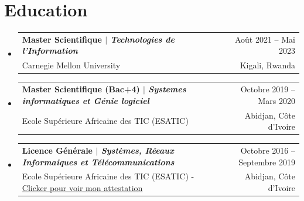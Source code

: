 \documentclass[A4,11pt]{article}
\makeatletter
\newcommand{\CVSubheading}[4]{
  \vspace{-2pt}\item
    \begin{tabular*}{0.97\textwidth}[t]{l@{\extracolsep{\fill}}r}
      \textbf{#1} & #2 \\
      \small#3 & \small #4 \\
    \end{tabular*}\vspace{-7pt}
}
\newcommand{\CVSubHeadingListStart}{\begin{itemize}[leftmargin=0.5cm, label={}]}
\newcommand{\CVSubHeadingListEnd}{\end{itemize}}
\makeatother
\begin{document}




\section{Education}
\CVSubHeadingListStart
\CVSubheading
{{Master Scientifique $|$ \emph{\small{Technologies de l'Information}}}}{Ao\^ut 2021 -- Mai 2023}
{Carnegie Mellon University}{Kigali, Rwanda}
\CVSubheading
{{Master Scientifique (Bac+4) $|$ \emph{\small{Systemes informatiques et Génie logiciel}}}}{Octobre 2019 -- Mars 2020}
{Ecole Supérieure Africaine des TIC (ESATIC) }{Abidjan, Côte d'Ivoire}
\CVSubheading
{Licence Générale $|$ \emph{\small{Systèmes, Réeaux Informaiques et Télécommunications}}}{Octobre 2016 -- Septembre 2019}
{Ecole Supérieure Africaine des TIC (ESATIC) - \href{https://drive.google.com/file/d/1AHcLovrqVw6Awh7r_sUYj2X1VdPfAZGq/view?usp=sharing}{Clicker pour voir mon attestation}}{Abidjan, Côte d'Ivoire}
\CVSubHeadingListEnd
\end{document}
